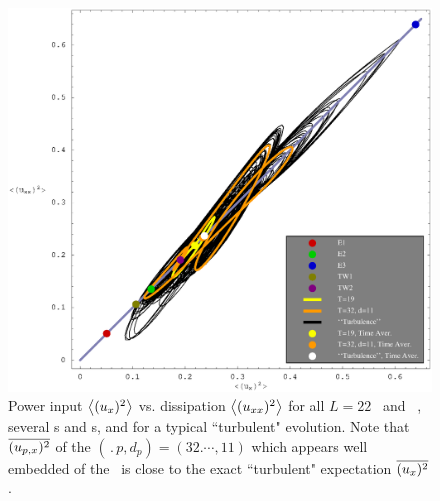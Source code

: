 \begin{figure}[t] \label{f:drivedrag}
\begin{center}
	\includegraphics[width=\textwidth]{figs/energyBalancePlot.eps}
\end{center}
\caption{
Power input $\left\langle {(u_{x})^2} \right\rangle$ vs. 
dissipation $\left\langle {(u_{xx})^2} \right\rangle$ for all $L=22$ \eqva\
and \reqva\ , several 
\po s and \rpo s, and for a typical ``turbulent"
evolution. Note that $\overline{(u_{p,x})^2}$
of the
$(\period{p},d_p) =(32.\cdots,11)$ 
 {\rpo} which appears well embedded 
of the \eqva\ is close to the exact ``turbulent"
expectation $\overline{(u_x)^2}$
.
        }
\end{figure}


